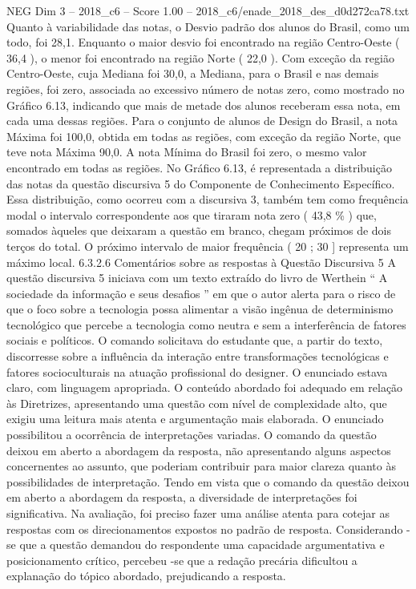 \begin{textsample}{NEG Dim 3 – 2018\_c6 – Score 1.00 – 2018\_c6/enade\_2018\_des\_d0d272ca78.txt}
Quanto à variabilidade das notas, o Desvio padrão dos alunos do Brasil, como um todo, foi 28,1.
Enquanto o maior desvio foi encontrado na região Centro-Oeste ( 36,4 ), o menor foi encontrado na região Norte ( 22,0 ).
Com exceção da região Centro-Oeste, cuja Mediana foi 30,0, a Mediana, para o Brasil e nas demais regiões, foi zero, associada ao excessivo número de notas zero, como mostrado no Gráfico 6.13, indicando que mais de metade dos alunos receberam essa nota, em cada uma dessas regiões.
Para o conjunto de alunos de Design do Brasil, a nota Máxima foi 100,0, obtida em todas as regiões, com exceção da região Norte, que teve nota Máxima 90,0.
A nota Mínima do Brasil foi zero, o mesmo valor encontrado em todas as regiões.
No Gráfico 6.13, é representada a distribuição das notas da questão discursiva 5 do Componente de Conhecimento Específico.
Essa distribuição, como ocorreu com a discursiva 3, também tem como frequência modal o intervalo correspondente aos que tiraram nota zero ( 43,8 \% ) que, somados àqueles que deixaram a questão em branco, chegam próximos de dois terços do total.
O próximo intervalo de maior frequência ( 20 ; 30 ] representa um máximo local. 6.3.2.6 Comentários sobre as respostas à Questão Discursiva 5 A questão discursiva 5 iniciava com um texto extraído do livro de Werthein “ A sociedade da informação e seus desafios ” em que o autor alerta para o risco de que o foco sobre a tecnologia possa alimentar a visão ingênua de determinismo tecnológico que percebe a tecnologia como neutra e sem a interferência de fatores sociais e políticos.
O comando solicitava do estudante que, a partir do texto, discorresse sobre a influência da interação entre transformações tecnológicas e fatores socioculturais na atuação profissional do designer.
O enunciado estava claro, com linguagem apropriada.
O conteúdo abordado foi adequado em relação às Diretrizes, apresentando uma questão com nível de complexidade alto, que exigiu uma leitura mais atenta e argumentação mais elaborada.
O enunciado possibilitou a ocorrência de interpretações variadas.
O comando da questão deixou em aberto a abordagem da resposta, não apresentando alguns aspectos concernentes ao assunto, que poderiam contribuir para maior clareza quanto às possibilidades de interpretação.
Tendo em vista que o comando da questão deixou em aberto a abordagem da resposta, a diversidade de interpretações foi significativa.
Na avaliação, foi preciso fazer uma análise atenta para cotejar as respostas com os direcionamentos expostos no padrão de resposta.
Considerando -se que a questão demandou do respondente uma capacidade argumentativa e posicionamento crítico, percebeu -se que a redação precária dificultou a explanação do tópico abordado, prejudicando a resposta.

\end{textsample}
